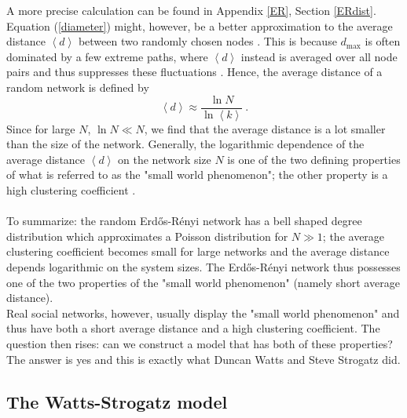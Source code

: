 \documentclass[11 pt , letterpaper , twoside , openright]{book}
\begin{document}
A more precise calculation can be found in Appendix \ref{ER}, Section \ref{ERdist}. Equation (\ref{diameter}) might, however, be a better approximation to the average distance $\left<d\right>$ between two randomly chosen nodes \cite{Albert2014}. This is because $d_{\textrm{max}}$ is often dominated by a few extreme paths, where $\left<d\right>$ instead is averaged over all node pairs and thus suppresses these fluctuations \cite{Albert2014}. Hence, the average distance of a random network is defined by \cite{Albert2014}
\begin{equation}\label{d}
	\left<d\right> \approx \frac{\ln{N}}{\ln{\left<k\right>}} \ .
\end{equation}
Since for large $N$, $\ln{N} \ll N$, we find that the average distance is a lot smaller than the size of the network. Generally, the logarithmic dependence of the average distance $\left<d\right>$ on the network size $N$ is one of the two defining properties of what is referred to as the "small world phenomenon"; the other property is a high clustering coefficient \cite{Easley2010}.  \\
\\
To summarize: the random Erd\H{o}s-R\'{e}nyi network has a bell shaped degree distribution which approximates a Poisson distribution for $N \gg 1$; the average clustering coefficient becomes small for large networks and the average distance depends logarithmic on the system sizes. The Erd\H{o}s-R\'{e}nyi network thus possesses one of the two properties of the "small world phenomenon" (namely short average distance).\\
Real social networks, however, usually display the "small world phenomenon" and thus have both a short average distance and a high clustering coefficient. The question then rises: can we construct a model that has both of these properties? The answer is yes and this is exactly what Duncan Watts and Steve Strogatz did.

\subsection{The Watts-Strogatz model}
\end{document}

